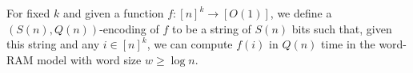\begin{definition}\label{def:encoding}
  For fixed \(k\) and given a function \(f : {[n]}^k \to [O(1)]\), we define
  a \((S(n),Q(n))\)-encoding of \(f\) to be a string of \(S(n)\) bits such
  that, given this string and any \(i \in {[n]}^k\), we can compute \(f(i)\)
  in \(Q(n)\) time in the word-RAM model with word size \(w \geq \log
  n\).
\end{definition}

